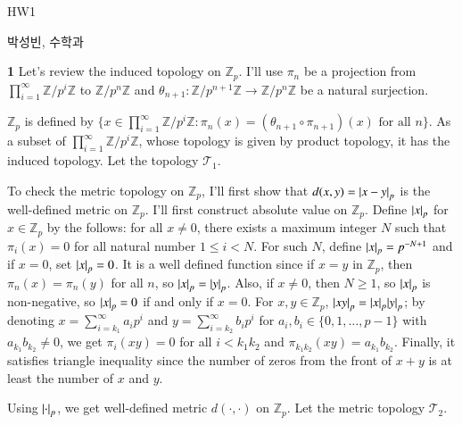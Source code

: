 \documentclass[a4paper, 12pt]{article}
\theoremstyle{Mydefinition}
\theoremstyle{Mytheorem}
\newcommand{\quotZ}[1]{\ensuremath{\mathbb{Z}/p^{#1}\mathbb{Z}}}
\begin{document}
\thispagestyle{myfirstpage}
\begin{center}
	\Large{HW1}
\end{center}
박성빈, 수학과

\noindent \textbf{1}
Let's review the induced topology on $\mathbb{Z}_p$. I'll use $\pi_n$ be a projection from 
$\prod_{i=1}^\infty \quotZ{i}$ to $\quotZ{n}$ and $\theta_{n+1}:\quotZ{n+1}\rightarrow \quotZ{n}$ be a natural surjection.

$\mathbb{Z}_p$ is defined by $\{x\in \prod_{i=1}^\infty \quotZ{i} : \pi_n(x) = (\theta_{n+1}\circ \pi_{n+1})(x) \textrm{ for all } n\}$. As a subset of $\prod_{i=1}^\infty \quotZ{i}$, whose topology is given by product topology, it has the induced topology. Let the topology $\mathcal{T}_1$.

To check the metric topology on $\mathbb{Z}_p$, I'll first show that $d(x,y) = \abs{x-y}_p$ is the well-defined metric on $\mathbb{Z}_p$. I'll first construct absolute value on $\mathbb{Z}_p$. Define $\abs{x}_p$ for $x\in \mathbb{Z}_p$ by the follows: for all $x\neq 0$, there exists a maximum integer $N$ such that $\pi_i(x) = 0$ for all natural number $1\leq i < N$. For such $N$, define $\abs{x}_p = p^{-N+1}$ and if $x=0$, set $\abs{x}_p = 0$. It is a well defined function since if $x=y$ in $\mathbb{Z}_p$, then $\pi_n(x) = \pi_n(y)$ for all $n$, so $\abs{x}_p = \abs{y}_p$. Also, if $x\neq 0$, then $N\geq 1$, so $\abs{x}_p$ is non-negative, so $\abs{x}_p = 0$ if and only if $x=0$. For $x,y\in\mathbb{Z}_p$, $\abs{xy}_p = \abs{x}_p\abs{y}_p$; by denoting $x = \sum_{i=k_1}^\infty a_i p^i$ and $y = \sum_{i=k_2}^\infty b_i p^i$ for $a_i, b_i\in \{0, 1, \ldots, p-1\}$ with $a_{k_1}b_{k_2}\neq 0$, we get $\pi_i(xy) = 0$ for all $i<k_1k_2$ and $\pi_{k_1k_2}(xy) = a_{k_1}b_{k_2}$. Finally, it satisfies triangle inequality since the number of zeros from the front of $x+y$ is at least the number of $x$ and $y$.

Using $\abs{\cdot}_p$, we get well-defined metric $d(\cdot,\cdot)$ on $\mathbb{Z}_p$. Let the metric topology $\mathcal{T}_2$.
\end{document}
